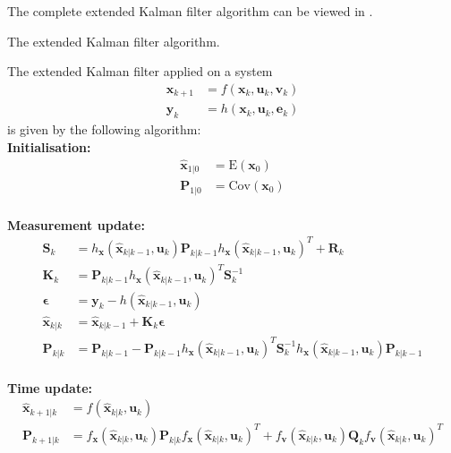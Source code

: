The complete extended Kalman filter algorithm can be viewed in .
\begin{algorithm}
\caption{The extended Kalman filter algorithm.}
\label{alg:EKF}
  The extended Kalman filter applied on a system
    \begin{align*}
    \boldsymbol{x}_{k+1} &= f(\boldsymbol{x}_{k},\boldsymbol{u}_{k}, \boldsymbol{v}_{k})\\
    \boldsymbol{y}_{k} &= h(\boldsymbol{x}_{k},\boldsymbol{u}_{k},\boldsymbol{e}_{k})
    \end{align*} is given by the following algorithm:\\
    \textbf{Initialisation:}
    \begin{align*}
    \hat{\boldsymbol{x}}_{1|0} &= \text{E}(\boldsymbol{x}_{0})\\
    \boldsymbol{P}_{1|0} &= \text{Cov}(\boldsymbol{x}_{0})\\
    \end{align*}
     
    \textbf{Measurement update:}
    \begin{align*}
    \boldsymbol{S}_{k} &= h_{\boldsymbol{x}}(\hat{\boldsymbol{x}}_{k|k-1},\boldsymbol{u}_{k}) \boldsymbol{P}_{k|k-1} h_{\boldsymbol{x}}(\hat{\boldsymbol{x}}_{k|k-1},\boldsymbol{u}_{k})^{T} + \boldsymbol{R}_{k}\\
    \boldsymbol{K}_{k} &= \boldsymbol{P}_{k|k-1} h_{\boldsymbol{x}}(\hat{\boldsymbol{x}}_{k|k-1},\boldsymbol{u}_{k})^{T} \boldsymbol{S}_{k}^{-1}\\
    \boldsymbol{\epsilon} &= \boldsymbol{y}_{k} - h(\hat{\boldsymbol{x}}_{k|k-1},\boldsymbol{u}_{k})\\
    \hat{\boldsymbol{x}}_{k|k} &= \hat{\boldsymbol{x}}_{k|k-1} + \boldsymbol{K}_{k}\boldsymbol{\epsilon}\\
    \boldsymbol{P}_{k|k} &= \boldsymbol{P}_{k|k-1} - \boldsymbol{P}_{k|k-1} h_{\boldsymbol{x}}(\hat{\boldsymbol{x}}_{k|k-1},\boldsymbol{u}_{k})^{T} \boldsymbol{S}_{k}^{-1} h_{\boldsymbol{x}}(\hat{\boldsymbol{x}}_{k|k-1},\boldsymbol{u}_{k}) \boldsymbol{P}_{k|k-1}\\
    \end{align*}
    
   \textbf{Time update:}
    \begin{align*}
    \hat{\boldsymbol{x}}_{k+1|k} &= f(\hat{\boldsymbol{x}}_{k|k},\boldsymbol{u}_{k})\\
    \boldsymbol{P}_{k+1|k} &= f_{\boldsymbol{x}}(\hat{\boldsymbol{x}}_{k|k},\boldsymbol{u}_ {k})\boldsymbol{P}_{k|k} f_{\boldsymbol{x}}(\hat{\boldsymbol{x}}_{k|k},\boldsymbol{u}_{k})^{T} + f_{\boldsymbol{v}}(\hat{\boldsymbol{x}}_{k|k},\boldsymbol{u}_{k}) \boldsymbol{Q}_{k} f_{\boldsymbol{v}}(\hat{\boldsymbol{x}}_{k|k},\boldsymbol{u}_{k})^{T}
    \end{align*}    
\end{algorithm}

